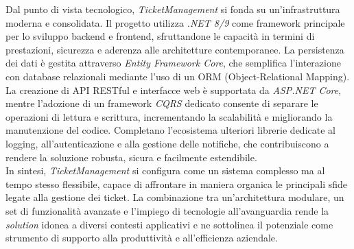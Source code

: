 Dal punto di vista tecnologico, \textit{TicketManagement} si fonda su un'infrastruttura moderna e consolidata. Il progetto utilizza \textit{.NET 8/9} come framework principale per lo sviluppo backend e frontend, sfruttandone le capacità in termini di prestazioni, sicurezza e aderenza alle architetture contemporanee. La persistenza dei dati è gestita attraverso \textit{Entity Framework Core}, che semplifica l'interazione con database relazionali mediante l'uso di un ORM (Object-Relational Mapping). La creazione di API RESTful e interfacce web è supportata da \textit{ASP.NET Core}, mentre l'adozione di un framework \textit{CQRS} dedicato consente di separare le operazioni di lettura e scrittura, incrementando la scalabilità e migliorando la manutenzione del codice. Completano l'ecosistema ulteriori librerie dedicate al logging, all'autenticazione e alla gestione delle notifiche, che contribuiscono a rendere la soluzione robusta, sicura e facilmente estendibile.
\\
In sintesi, \textit{TicketManagement} si configura come un sistema complesso ma al tempo stesso flessibile, capace di affrontare in maniera organica le principali sfide legate alla gestione dei ticket. La combinazione tra un'architettura modulare, un set di funzionalità avanzate e l'impiego di tecnologie all'avanguardia rende la \textit{solution} idonea a diversi contesti applicativi e ne sottolinea il potenziale come strumento di supporto alla produttività e all'efficienza aziendale.

